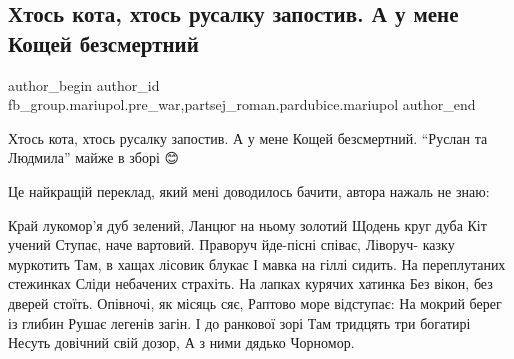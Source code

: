  
 
 
 
 

\subsection{Хтось кота, хтось русалку запостив. А у мене Кощей безсмертний}
\label{sec:23_01_2023.fb.fb_group.mariupol.pre_war.3.khtos_kota__khtos_ru}
 
\ifcmt
 author_begin
   author_id fb_group.mariupol.pre_war,partsej_roman.pardubice.mariupol
 author_end
\fi

Хтось кота, хтось русалку запостив. А у мене Кощей безсмертний. \enquote{Руслан та
Людмила} майже в зборі 😊

Це найкращій переклад, який мені доводилось бачити, автора нажаль не знаю:

\obeycr
Край лукомор'я дуб зелений,
Ланцюг на ньому золотий
Щодень круг дуба Кіт учений
Ступає, наче вартовий.
Праворуч йде-пісні співає,
Ліворуч- казку муркотить
Там, в хащах лісовик блукає
І мавка на гіллі сидить.
На переплутаних стежинках
Сліди небачених страхіть.
На лапках курячих хатинка
Без вікон, без дверей стоїть.
Опівночі, як місяць сяє,
Раптово море відступає:
На мокрий берег із глибин
Рушає легенів загін.
І до ранкової зорі
Там тридцять три богатирі
Несуть довічний свій дозор,
А з ними дядько Чорномор.
\restorecr
